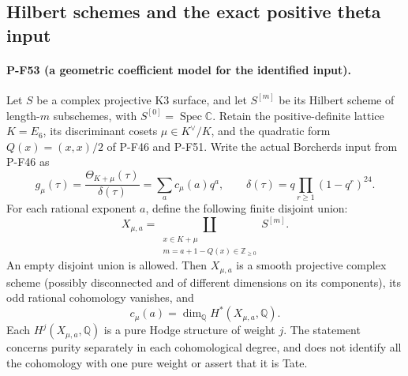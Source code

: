 \subsection{Hilbert schemes and the exact positive theta input}

\paragraph{P-F53 (a geometric coefficient model for the identified input).}
Let $S$ be a complex projective K3 surface, and let $S^{[m]}$
be its Hilbert scheme of length-$m$ subschemes, with
$S^{[0]}=\operatorname{Spec}\mathbb C$.
Retain the positive-definite lattice $K=E_6$, its discriminant
cosets $\mu\in K^\vee/K$, and the quadratic form
$Q(x)=(x,x)/2$ of P-F46 and P-F51. Write the actual
Borcherds input from P-F46 as
\[
 g_\mu(\tau)=\frac{\Theta_{K+\mu}(\tau)}{\delta(\tau)}
        =\sum_a c_\mu(a)q^a,
 \qquad \delta(\tau)=q\prod_{r\ge1}(1-q^r)^{24}.
                                                        \tag{P-F53a}
\]
For each rational exponent $a$, define the following finite disjoint union:
\[
 X_{\mu,a}=
 \coprod_{\substack{x\in K+\mu\\
                  m=a+1-Q(x)\in\mathbb Z_{\ge0}}} S^{[m]}.
                                                        \tag{P-F53b}
\]
An empty disjoint union is allowed. Then $X_{\mu,a}$ is a
smooth projective complex scheme (possibly disconnected and
of different dimensions on its components), its odd rational
cohomology vanishes, and
\[
          c_\mu(a)=\dim_{\mathbb Q}H^*(X_{\mu,a},\mathbb Q).
                                                        \tag{P-F53c}
\]
Each $H^j(X_{\mu,a},\mathbb Q)$ is a pure Hodge structure of
weight $j$. The statement concerns purity separately in each
cohomological degree, and does not identify all the cohomology
with one pure weight or assert that it is Tate.

